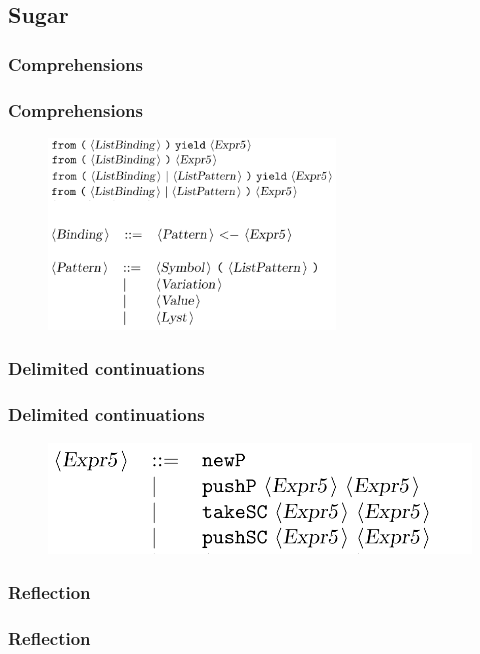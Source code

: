 \documentclass{beamer}
\begin{document}
  \subsection{Sugar}
  \subsubsection{Comprehensions}
  \begin{frame}
    \frametitle{Comprehensions}
    \begin{figure}[ht]
      \begin{center}        
        \includegraphics[height=2in]{pipelinefigures/SyntaxSugarComprehensions.pdf}
      \end{center}      
    \end{figure}
  \end{frame}
  \subsubsection{Delimited continuations}
  \begin{frame}
    \frametitle{Delimited continuations}
    \begin{figure}[ht]
      \begin{center}        
        \includegraphics[width=\textwidth,height=0.8\textheight,keepaspectratio]{pipelinefigures/SyntaxSugarDelimCC.pdf}
      \end{center}      
    \end{figure}
  \end{frame}
  \subsubsection{Reflection}
  \begin{frame}
    \frametitle{Reflection}
  \end{frame}
\end{document}
